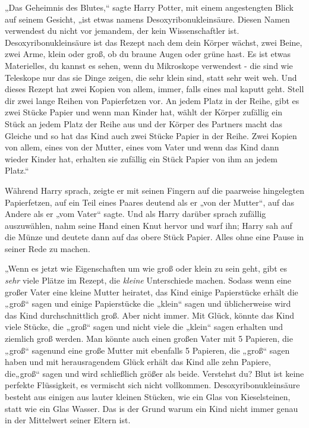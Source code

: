 {„Das Geheimnis des Blutes,“ sagte Harry Potter, mit einem angestengten Blick auf seinem Gesicht, „ist etwas namens Desoxyribonukleinsäure. Diesen Namen verwendest du nicht vor jemandem, der kein Wissenschaftler ist. Desoxyribonukleinsäure ist das Rezept nach dem dein Körper wächst, zwei Beine, zwei Arme, klein oder groß, ob du braune Augen oder grüne hast. Es ist etwas Materielles, du kannst es sehen, wenn du Mikroskope verwendest - die sind wie Teleskope nur das sie Dinge zeigen, die sehr klein sind, statt sehr weit weh. Und dieses Rezept hat zwei Kopien von allem, immer, falls eines mal kaputt geht. Stell dir zwei lange Reihen von Papierfetzen vor. An jedem Platz in der Reihe, gibt es zwei Stücke Papier und wenn man Kinder hat, wählt der Körper zufällig ein Stück an jedem Platz der Reihe aus und der Körper des Partners macht das Gleiche und so hat das Kind auch zwei Stücke Papier in der Reihe. Zwei Kopien von allem, eines von der Mutter, eines vom Vater und wenn das Kind dann wieder Kinder hat, erhalten sie zufällig ein Stück Papier von ihm an jedem Platz.“

Während Harry sprach, zeigte er mit seinen Fingern auf die paarweise hingelegten Papierfetzen, auf ein Teil eines Paares deutend als er „von der Mutter“, auf das Andere als er „vom Vater“ sagte. Und als Harry darüber sprach zufällig auszuwählen, nahm seine Hand einen Knut hervor und warf ihn; Harry sah auf die Münze und deutete dann auf das obere Stück Papier. Alles ohne eine Pause in seiner Rede zu machen.

„Wenn es jetzt wie Eigenschaften um wie groß oder klein zu sein geht, gibt es \emph{sehr} viele Plätze im Rezept, die \emph{kleine} Unterschiede machen. Sodass wenn eine großer Vater eine kleine Mutter heiratet, das Kind einige Papierstücke erhält die „groß“ sagen und einige Papierstücke die „klein“ sagen und üblicherweise wird das Kind durchschnittlich groß. Aber nicht immer. Mit Glück, könnte das Kind viele Stücke, die „groß“ sagen und nicht viele die „klein“ sagen erhalten und ziemlich groß werden. Man könnte auch einen großen Vater mit 5 Papieren, die „groß“ sagenund eine große Mutter mit ebenfalls 5 Papieren, die „groß“ sagen haben und mit herausragendem Glück erhält das Kind alle zehn Papiere, die„groß“ sagen und wird schließlich größer als beide. Verstehst du? Blut ist keine perfekte Flüssigkeit, es vermischt sich nicht vollkommen. Desoxyribonukleinsäure besteht aus einigen aus lauter kleinen Stücken, wie ein Glas von Kieselsteinen, statt wie ein Glas Wasser. Das is der Grund warum ein Kind nicht immer genau in der Mittelwert seiner Eltern ist.

}

